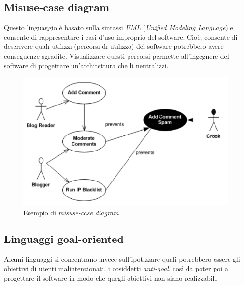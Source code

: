 \documentclass[12pt, a4paper]{report}
\theoremstyle{def}
\theoremstyle{definition}
\begin{document}
\subsection{Misuse-case diagram}
Questo linguaggio è basato sulla sintassi \emph{UML} (\emph{Unified Modeling
Language}) e consente di rappresentare i casi d'uso improprio del software.
Cioè, consente di descrivere quali utilizzi (percorsi di utilizzo) del software
potrebbero avere conseguenze sgradite. Visualizzare questi percorsi permette
all'ingegnere del software di progettare un'architettura che li neutralizzi.

\begin{figure}[h]
    \centering
    \includegraphics[width=\textwidth]{misuse-case-diagram.png}
    \caption{Esempio di \emph{misuse-case diagram}}
\end{figure}

\subsection{Linguaggi goal-oriented}
Alcuni linguaggi si concentrano invece sull'ipotizzare quali potrebbero essere
gli obiettivi di utenti malintenzionati, i cosiddetti \emph{anti-goal}, così da
poter poi a progettare il software in modo che quegli obiettivi non siano
realizzabili.
\end{document}
